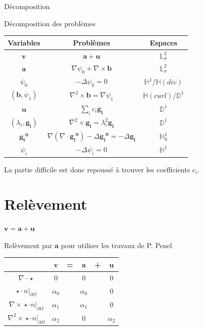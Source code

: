 \documentclass{beamer}
\newcommand{\LL}{{\mathbb{L}}}
\newcommand{\HH}{{\mathbb{H}}}
\newcommand{\DD}{{\mathbb{D}}}
\newcommand{\grad}{{\nabla}}
\newcommand{\laplace}{{\Delta}}
\newcommand{\rot}{{\nabla\times}}
\newcommand{\rott}{{\nabla^2\times}}
\newcommand{\diverg}{{\nabla\cdot}}
\newcommand{\restr}{{\big\rvert_{\partial\Omega}}}
\begin{document}
\begin{frame}{Décomposition}
\begin{block}{Décomposition des problèmes}
\begin{center}
\begin{tabular}{|c|c|c|}
\hline
Variables & Problèmes & Espaces\\ \hline
$\mathbf{v}$ & $\mathbf{a} + \mathbf{u}$ & $\LL^2_\sigma$\\ \hline
$\mathbf{a}$ & $\grad\psi_0 + \rot \mathbf{b}$ & $\LL^2_\sigma$\\ \hline
$\psi_0$ & $-\laplace\psi_0 = 0$ & $\HH^1/\HH(div)$\\ \hline
$(\mathbf{b},\psi_1)$ & $\rott \mathbf{b}= \grad\psi_1$ & $\HH(curl)/\DD^1$ \\ \hline
$\mathbf{u}$ & $\sum_i c_i\mathbf{g_i}$ & $\DD^1$\\ \hline
$(\lambda_i,\mathbf{g_i})$ & $\rott  \mathbf{g_i} = \lambda_i^2 \mathbf{g_i}$ & $\DD^1$ \\ \hline
$\mathbf{\mathbf{g_i}^0}$ & $\grad(\diverg \mathbf{\mathbf{g_i}^0}) - \laplace \mathbf{\mathbf{g_i}^0} = - \laplace \mathbf{g_i}$ & $\HH^1_0$\\ \hline
$\psi_i$ & $-\laplace \psi_i = 0$ & $\HH^1$\\ \hline
\end{tabular}
\end{center}
La partie difficile est donc repoussé à trouver les coefficients $c_i$. 
\end{block}
\end{frame}

\section{Relèvement}
\begin{frame}{$\mathbf{v}=\mathbf{a}+\mathbf{u}$}
\begin{block}{Relèvement par $\mathbf{a}$ pour utiliser les travaux de P. Penel}
\begin{center}
\begin{tabular}{c|ccccc}
& $\mathbf{v}$ & = & $\mathbf{a}$ & + & $\mathbf{u}$ \\ \hline
$\diverg\star$ & 0 & & 0 & & 0\\ \hline
$\star\cdot n\restr$ & $\alpha_0$ & & $\alpha_0$ & & 0\\ \hline
$\rot\star\cdot n\restr$ & $\alpha_1$ & & $\alpha_1$ & & 0\\\hline
$\rott\star\cdot n\restr$ & $\alpha_2$ & & 0 & & $\alpha_2$ 
\end{tabular}
\end{center}
\end{block}
\end{frame}
\end{document}
